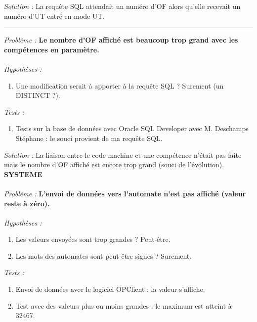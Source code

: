 \documentclass[a4paper,12pt]{extarticle}
\begin{document}
\emph{Solution :} La requête SQL attendait un numéro d’OF alors qu’elle recevait un numéro d’UT entré en mode UT.
\begin{center}
	\rule{8cm}{0.1pt}
\end{center}

\emph{Problème :} \textbf{Le nombre d’OF affiché est beaucoup trop grand avec les compétences en paramètre.}\\
\\

\emph{Hypothèses :}

\begin{enumerate}[-]
    \item Une modification serait à apporter à la requête SQL ? Surement (un DISTINCT ?).
\end{enumerate}

\emph{Tests :}

\begin{enumerate}[-]
    \item Tests sur la base de données avec Oracle SQL Developer avec M. Deschamps Stéphane : le souci provient de ma requête SQL.
\end{enumerate}

\emph{Solution :} La liaison entre le code machine et une compétence n’était pas faite mais le nombre d’OF affiché est encore trop grand (souci de l’évolution).\\

\textbf{SYSTEME}\\
\\
\emph{Problème :} \textbf{L’envoi de données vers l’automate n’est pas affiché (valeur reste à zéro).}\\
\\
\emph{Hypothèses :}

\begin{enumerate}[-]
    \item Les valeurs envoyées sont trop grandes ? Peut-être.
	\item Les mots des automates sont peut-être signés ? Surement.
\end{enumerate}

\emph{Tests :}

\begin{enumerate}[-]
    \item Envoi de données avec le logiciel OPClient : la valeur s’affiche.
	\item Test avec des valeurs plus ou moins grandes : le maximum est atteint à 32467.
\end{enumerate}
\end{document}
